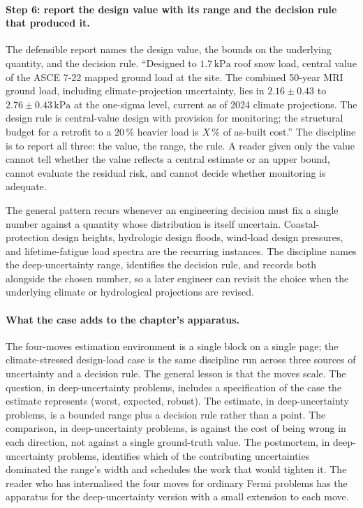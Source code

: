 \paragraph{Step 6: report the design value with its range and the
decision rule that produced it.}
The defensible report names the design value, the bounds on the
underlying quantity, and the decision rule. ``Designed to $1.7 \,
\si{\kilo\pascal}$ roof snow load, central value of the
ASCE 7-22 mapped ground load at the site. The combined 50-year
MRI ground load, including climate-projection uncertainty, lies
in $2.16 \pm 0.43$ to $2.76 \pm 0.43 \,\si{\kilo\pascal}$ at
the one-sigma level, current as of 2024 climate projections. The
design rule is central-value design with provision for
monitoring; the structural budget for a retrofit to a $20\,\%$
heavier load is $X\,\%$ of as-built cost.'' The discipline is to
report all three: the value, the range, the rule. A reader given
only the value cannot tell whether the value reflects a central
estimate or an upper bound, cannot evaluate the residual risk,
and cannot decide whether monitoring is adequate.

The general pattern recurs whenever an engineering decision must
fix a single number against a quantity whose distribution is
itself uncertain. Coastal-protection design heights, hydrologic
design floods, wind-load design pressures, and lifetime-fatigue
load spectra are the recurring instances. The discipline names
the deep-uncertainty range, identifies the decision rule, and
records both alongside the chosen number, so a later engineer
can revisit the choice when the underlying climate or
hydrological projections are revised.

\paragraph{What the case adds to the chapter's apparatus.}
The four-moves estimation environment is a single block on a
single page; the climate-stressed design-load case is the same
discipline run across three sources of uncertainty and a
decision rule. The general lesson is that the moves scale. The
question, in deep-uncertainty problems, includes a specification
of the case the estimate represents (worst, expected, robust). The
estimate, in deep-uncertainty problems, is a bounded range plus a
decision rule rather than a point. The comparison, in
deep-uncertainty problems, is against the cost of being wrong in
each direction, not against a single ground-truth value. The
postmortem, in deep-uncertainty problems, identifies which of the
contributing uncertainties dominated the range's width and
schedules the work that would tighten it. The reader who has
internalised the four moves for ordinary Fermi problems has the
apparatus for the deep-uncertainty version with a small extension
to each move.

